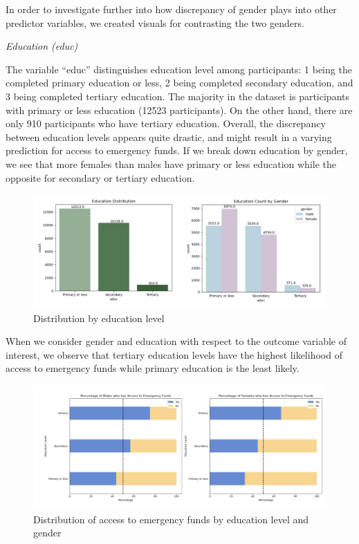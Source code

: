 \documentclass[12pt]{article}
\begin{document}
In order to investigate further into how discrepancy of gender plays
into other predictor variables, we created visuals for contrasting the
two genders.

\emph{Education (educ)}

The variable ``educ'' distinguishes education level among participants:
1 being the completed primary education or less, 2 being completed
secondary education, and 3 being completed tertiary education. The
majority in the dataset is participants with primary or less education
(12523 participants). On the other hand, there are only 910 participants
who have tertiary education. Overall, the discrepancy between education
levels appears quite drastic, and might result in a varying prediction
for access to emergency funds. If we break down education by gender, we
see that more females than males have primary or less education while
the opposite for secondary or tertiary education.

\begin{figure}

{\centering \includegraphics[width=1\linewidth]{graphs/f24_graph4} 

}

\caption{Distribution by education level}\label{fig:unnamed-chunk-6}
\end{figure}

When we consider gender and education with respect to the outcome
variable of interest, we observe that tertiary education levels have the
highest likelihood of access to emergency funds while primary education
is the least likely.

\begin{figure}

{\centering \includegraphics[width=1\linewidth]{graphs/f24_graph5} 

}

\caption{Distribution of access to emergency funds by education level and gender}\label{fig:unnamed-chunk-7}
\end{figure}
\end{document}
